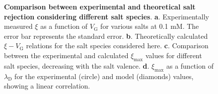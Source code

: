 \begin{figure}[H]
  \centering
  \caption{\textbf{Comparison between experimental and theoretical
      salt rejection considering different salt
      species}. \textbf{a}. Experimentally measured $\xi$ as a
    function of $V_{\mathrm{G}}$ for various salts at 0.1 mM. The
    error bar represents the standard error. \textbf{b}. Theoretically
    calculated $\xi-V_{\mathrm{G}}$ relations for the salt species
    considered here. \textbf{c}. Comparison between the experimental
    and calculated $\xi_{\mathrm{max}}$ values for different salt
    species, decreasing with the salt
    valence. \textbf{d}. $\xi_{\mathrm{max}}$ as a function of
    $\lambda_{\mathrm{D}}$ for the experimental (circle) and model
    (diamonds) values, showing a linear correlation.}
  \label{fig:6}
\end{figure}






